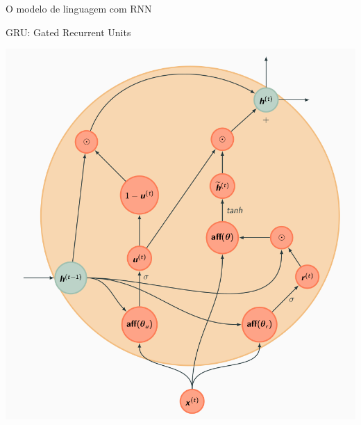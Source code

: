\documentclass[10pt]{beamer}
\begin{document}
\begin{frame}{O modelo de linguagem com RNN}

\end{frame}



\begin{frame}{GRU: Gated Recurrent Units}
\begin{center}
\includegraphics[scale=0.25]{images/gru.png}
\end{center}
\end{frame}


\end{document}
